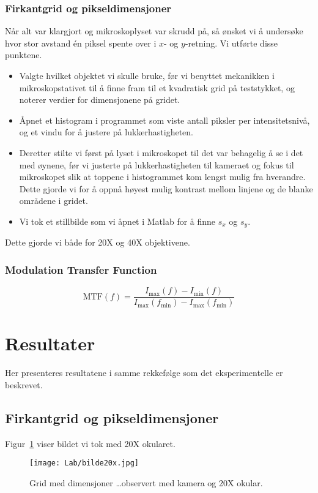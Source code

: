 \documentclass[a4paper,11pt, twocolumn]{article}
\begin{document}
\subsubsection{Firkantgrid og pikseldimensjoner}
Når alt var klargjort og mikroskoplyset var skrudd på, så ønsket vi å undersøke hvor stor avstand \'en piksel spente over i $x$- og $y$-retning. Vi utførte disse punktene.

\begin{itemize}
	\item Valgte hvilket objektet vi skulle bruke, før vi benyttet mekanikken i mikroskopstativet til å finne fram til et kvadratisk grid på teststykket, og noterer verdier for dimensjonene på gridet.
	\item Åpnet et histogram i programmet som viste antall piksler per intensitetsnivå, og et vindu for å justere på lukkerhastigheten.
	\item Deretter stilte vi først på lyset i mikroskopet til det var behagelig å se i det med øynene, før vi justerte på lukkerhastigheten til kameraet og fokus til mikroskopet slik at toppene i histogrammet kom lengst mulig fra hverandre. Dette gjorde vi for å oppnå høyest mulig kontrast mellom linjene og de blanke områdene i gridet.
	\item Vi tok et stillbilde som vi åpnet i Matlab for å finne $s_x$ og $s_y$. 
\end{itemize}

Dette gjorde vi både for 20X og 40X objektivene.

\subsubsection{Modulation Transfer Function}
\begin{equation}
	\text{MTF}(f) = \frac{I_{\max}(f)-I_{\min}(f)}{I_{\max}(f_{\min})-I_{\max}(f_{\min})}
	\label{eq:MTF}
\end{equation}

\section{Resultater}
Her presenteres resultatene i samme rekkefølge som det eksperimentelle er beskrevet.
\subsection{Firkantgrid og pikseldimensjoner}
Figur~\ref{fig:grid20x} viser bildet vi tok med 20X okularet.
\begin{figure}[!ht]
	\centering
	\texttt{[image: Lab/bilde20x.jpg]}
	\caption{Grid med dimensjoner \ldots observert med kamera og 20X okular.}
	\label{fig:grid20x}
\end{figure}
\end{document}
